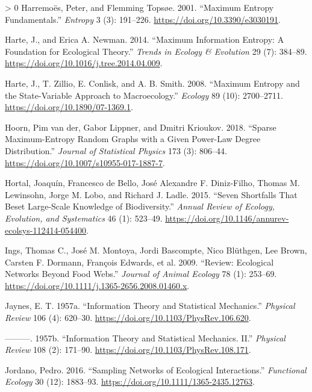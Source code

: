 \documentclass[10pt,oneside]{article}
\newlength{\cslhangindent}
\newenvironment{CSLReferences}[3] %
 {%
  \setlength{\parindent}{0pt}
  \ifodd #1 \everypar{\setlength{\hangindent}{\cslhangindent}}\ignorespaces\fi
  \ifnum #2 > 0
  \setlength{\parskip}{#2\baselineskip}
  \fi
 }%
 {}
\begin{document}
\begin{CSLReferences}{1}{0}
\leavevmode\hypertarget{ref-Harremoes2001MaxEnt}{}%
Harremoës, Peter, and Flemming Topsøe. 2001. {``Maximum Entropy
Fundamentals.''} \emph{Entropy} 3 (3): 191--226.
\url{https://doi.org/10.3390/e3030191}.

\leavevmode\hypertarget{ref-Harte2014MaxInf}{}%
Harte, J., and Erica A. Newman. 2014. {``Maximum Information Entropy: A
Foundation for Ecological Theory.''} \emph{Trends in Ecology \&
Evolution} 29 (7): 384--89.
\url{https://doi.org/10.1016/j.tree.2014.04.009}.

\leavevmode\hypertarget{ref-Harte2008MaxEnt}{}%
Harte, J., T. Zillio, E. Conlisk, and A. B. Smith. 2008. {``Maximum
Entropy and the State-Variable Approach to Macroecology.''}
\emph{Ecology} 89 (10): 2700--2711.
\url{https://doi.org/10.1890/07-1369.1}.

\leavevmode\hypertarget{ref-vanderHoorn2018SpaMaxa}{}%
Hoorn, Pim van der, Gabor Lippner, and Dmitri Krioukov. 2018. {``Sparse
Maximum-Entropy Random Graphs with a Given Power-Law Degree
Distribution.''} \emph{Journal of Statistical Physics} 173 (3): 806--44.
\url{https://doi.org/10.1007/s10955-017-1887-7}.

\leavevmode\hypertarget{ref-Hortal2015SevSho}{}%
Hortal, Joaquín, Francesco de Bello, José Alexandre F. Diniz-Filho,
Thomas M. Lewinsohn, Jorge M. Lobo, and Richard J. Ladle. 2015. {``Seven
Shortfalls That Beset Large-Scale Knowledge of Biodiversity.''}
\emph{Annual Review of Ecology, Evolution, and Systematics} 46 (1):
523--49. \url{https://doi.org/10.1146/annurev-ecolsys-112414-054400}.

\leavevmode\hypertarget{ref-Ings2009RevEco}{}%
Ings, Thomas C., José M. Montoya, Jordi Bascompte, Nico Blüthgen, Lee
Brown, Carsten F. Dormann, François Edwards, et al. 2009. {``Review:
Ecological Networks Beyond Food Webs.''} \emph{Journal of Animal
Ecology} 78 (1): 253--69.
\url{https://doi.org/10.1111/j.1365-2656.2008.01460.x}.

\leavevmode\hypertarget{ref-Jaynes1957InfThe}{}%
Jaynes, E. T. 1957a. {``Information Theory and Statistical Mechanics.''}
\emph{Physical Review} 106 (4): 620--30.
\url{https://doi.org/10.1103/PhysRev.106.620}.

\leavevmode\hypertarget{ref-Jaynes1957InfThea}{}%
---------. 1957b. {``Information Theory and Statistical Mechanics.
II.''} \emph{Physical Review} 108 (2): 171--90.
\url{https://doi.org/10.1103/PhysRev.108.171}.

\leavevmode\hypertarget{ref-Jordano2016SamNeta}{}%
Jordano, Pedro. 2016. {``Sampling Networks of Ecological
Interactions.''} \emph{Functional Ecology} 30 (12): 1883--93.
\url{https://doi.org/10.1111/1365-2435.12763}.


\end{CSLReferences}
\end{document}

